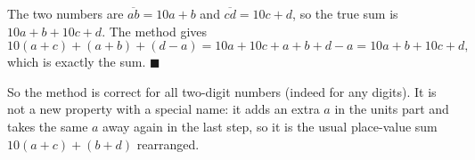 The two numbers are $\overline{ab}=10a+b$ and $\overline{cd}=10c+d$, so the true sum is $10a+b+10c+d$. The method gives
\[10(a+c)+(a+b)+(d-a)=10a+10c+a+b+d-a=10a+b+10c+d,\]
which is exactly the sum. $\blacksquare$

So the method is correct for all two-digit numbers (indeed for any digits). It is not a new property with a special name: it adds an extra $a$ in the units part and takes the same $a$ away again in the last step, so it is the usual place-value sum $10(a+c)+(b+d)$ rearranged.
